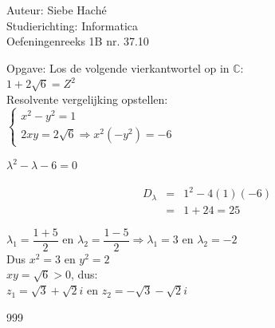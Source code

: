 \documentclass[a4paper]{article}
\begin{document}
\noindent \large Auteur: Siebe Haché \\
\noindent \large Studierichting: Informatica\\
\noindent \large Oefeningenreeks 1B nr. 37.10\\

\medskip

\normalsize

Opgave: Los de volgende vierkantwortel op in $\mathbb{C}$:\\

$ 1 + 2\sqrt{6} = Z^2$\\

Resolvente vergelijking opstellen:\\

$\left\{ \begin{array}{l} 
	x^2 - y^2 = 1\\ 
	2xy = 2\sqrt{6} \Rightarrow x^2(-y^2) = -6 
\end{array} \right.$

$\lambda^2 - \lambda - 6 = 0 $

\begin{eqnarray*}
D_{\lambda} &=&1^2 - 4(1)(-6) \\
		&=& 1 + 24 = 25
\end{eqnarray*}

$\lambda_1 = \dfrac{1 + 5}{2}$ en $\lambda_2 = \dfrac{1 - 5}{2}\Rightarrow \lambda_1 = 3$ en $\lambda_2 = -2 $ \\

Dus $x^2 = 3$  en $y^2 = 2$  \\

$xy = \sqrt{6} > 0$, dus:\\

$z_1 = \sqrt{3} + \sqrt{2}i$ en $z_2 = -\sqrt{3} -\sqrt{2}i$\\




\begin{thebibliography}{999}
\end{thebibliography}
\end{document}
